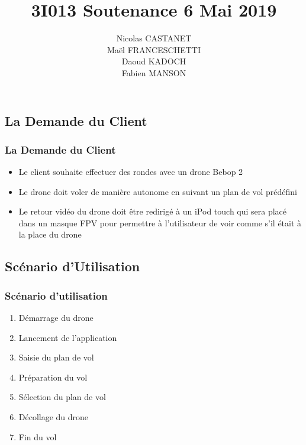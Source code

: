 \documentclass{beamer}
\title{3I013 Soutenance 6 Mai 2019}
\author{Nicolas CASTANET\\Maël FRANCESCHETTI\\Daoud KADOCH\\Fabien MANSON\\}
\begin{document}
	\begin{frame}
		\begin{center}
		\date{}
		\maketitle
		\end{center}
	\end{frame}
	

	
	
	\begin{frame}
		\section{La Demande du Client}
		\begin{center}
		\frametitle{La Demande du Client}
		\begin{itemize}
		    \item Le client souhaite effectuer des rondes avec un drone Bebop 2\\
		    \item Le drone doit voler de manière autonome en suivant un plan de vol prédéfini \\
		    \item Le retour vidéo du drone doit être redirigé à un iPod touch qui sera placé dans un masque FPV pour permettre à l'utilisateur de voir comme s'il était à la place du drone\\
		\end{itemize}
		   
		\end{center}
	\end{frame}
	\begin{frame}
		\section{Scénario d'Utilisation}
		\begin{center}
		\frametitle{Scénario d'utilisation}
		\begin{enumerate}
		    \item Démarrage du drone\\
		    \item Lancement de l'application \\
		    \item Saisie du plan de vol 
		    \item Préparation du vol
		    \item Sélection du plan de vol
		    \item Décollage du drone
		    \item Fin du vol
		\end{enumerate}
		   
		\end{center}
	\end{frame}
	
\end{document}

